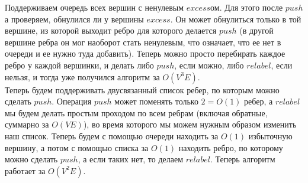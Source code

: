 \begin{algorithm}
    Поддерживаем очередь всех вершин с ненулевым $excess$ом. Для этого после $push$а проверяем, обнулился ли у вершины $excess$. Он может обнулиться только в той вершине, из которой выходит ребро для которого делается $push$ (в другой вершине ребра он мог наоборот стать ненулевым, что означает, что ее нет в очереди и ее нужно туда добавить). Теперь можно просто перебирать каждое ребро у каждой вершинки, и делать либо $push$, если можно, либо $relabel$, если нельзя, и тогда уже получился алгоритм за $O(V^3E)$. \\
    Теперь будем поддерживать двусвязанный список ребер, по которым можно сделать $push$. Операция $push$ может поменять только $2 = O(1)$ ребер, а $relabel$ мы будем делать простым проходом по всем ребрам (включая обратные, суммарно за $O(VE)$), во время которого мы можем нужным образом изменить наш список. Теперь будем с помощью очереди находить за $O(1)$ избыточную вершину, а потом с помощью списка за $O(1)$ находить ребро, по которому можно сделать $push$, а если таких нет, то делаем $relabel$. Теперь алгоритм работает за $O(V^2E)$. \\
\end{algorithm}


